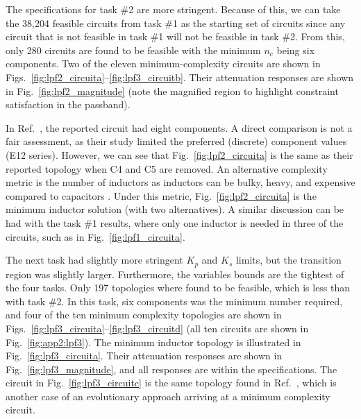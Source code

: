 

The specifications for task \#2 are more stringent.
Because of this, we can take the 38,204 feasible circuits from task \#1 as the starting set of circuits since any circuit that is not feasible in task \#1 will not be feasible in task \#2.
From this, only 280 circuits are found to be feasible with the minimum $n_c$ being six components.
Two of the eleven minimum-complexity circuits are shown in Figs.~\ref{fig:lpf2_circuita}--\ref{fig:lpf3_circuitb}.
Their attenuation responses are shown in Fig.~\ref{fig:lpf2_magnitude} (note the magnified region to highlight constraint satisfaction in the passband).

In Ref.~\cite{Gan2010a}, the reported circuit had eight components.
A direct comparison is not a fair assessment, as their study limited the preferred (discrete) component values (E12 series).
However, we can see that Fig.~\ref{fig:lpf2_circuita} is the same as their reported topology when \textsf{C4} and \textsf{C5} are removed.
An alternative complexity metric is the number of inductors as inductors can be bulky, heavy, and expensive compared to capacitors \cite{Wanhammar2009a}.
Under this metric, Fig.~\ref{fig:lpf2_circuita} is the minimum inductor solution (with two alternatives).
A similar discussion can be had with the task \#1 results, where only one inductor is needed in three of the circuits, such as in Fig.~\ref{fig:lpf1_circuita}.



The next task had slightly more stringent $K_p$ and $K_s$ limits, but the transition region was slightly larger.
Furthermore, the variables bounds are the tightest of the four tasks.
Only 197 topologies where found to be feasible, which is less than with task \#2. 
In this task, six components was the minimum number required, and four of the ten minimum complexity topologies are shown in Figs.~\ref{fig:lpf3_circuita}--\ref{fig:lpf3_circuitd} (all ten circuits are shown in Fig.~\ref{fig:app2:lpf3}). The minimum inductor topology is illustrated in Fig.~\ref{fig:lpf3_circuita}. 
Their attenuation responses are shown in Fig.~\ref{fig:lpf3_magnitude}, and all responses are within the specifications.
The circuit in Fig.~\ref{fig:lpf3_circuitc} is the same topology found in Ref.~\cite{Das2007a}, which is another case of an evolutionary approach arriving at a minimum complexity circuit.



